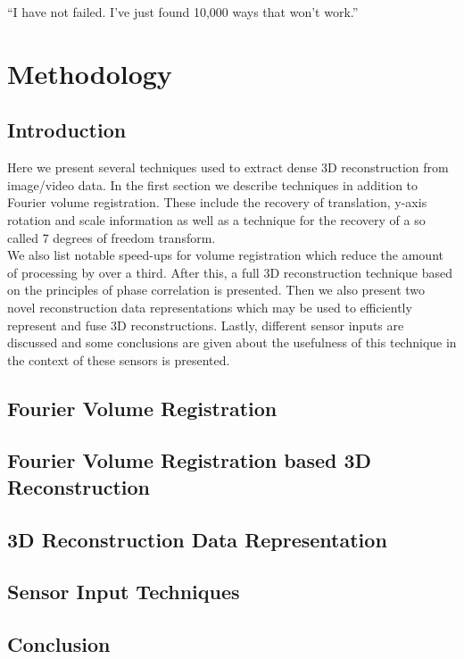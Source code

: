 \begin{savequote}[8cm]
  ``I have not failed. I've just found 10,000 ways that won't work.''
\end{savequote}
\makeatletter
\chapter{Methodology}

\section{Introduction}

Here we present several techniques used to extract dense 3D reconstruction from image/video data. In the first section we describe techniques in addition to Fourier volume registration. These include the recovery of translation, y-axis rotation and scale information as well as a technique for the recovery of a so called 7 degrees of freedom transform. \\

We also list notable speed-ups for volume registration which reduce the amount of processing by over a third. After this, a full 3D reconstruction technique based on the principles of phase correlation is presented. Then we also present two novel reconstruction data representations which may be used to efficiently represent and fuse 3D reconstructions. Lastly, different sensor inputs are discussed and some conclusions are given about the usefulness of this technique in the context of these sensors is presented.

\section{Fourier Volume Registration} 




\section{Fourier Volume Registration based 3D Reconstruction}



\section{3D Reconstruction Data Representation}
\label{sec:3DDataRepresentations}


\section{Sensor Input Techniques}



\section{Conclusion}